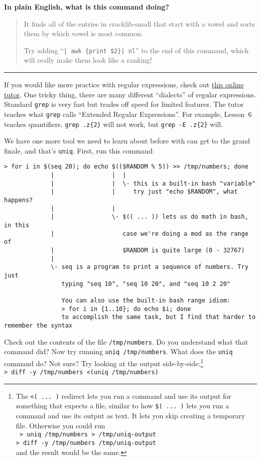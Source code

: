 \documentclass{article}
\begin{document}
\smallskip
\noindent
\textbf{In plain English, what is this command doing?}
\begin{quote}
  \color{violet}
  It finds all of the entries in cracklib-small that start with a vowel and
  sorts them by which vowel is most common.

  Try adding ``\texttt{| awk \textquotesingle\{print \$2\}\textquotesingle | nl}''
  to the end of this command, which will really make them look like a ranking!
\end{quote}


\vfill
\hrule
\smallskip
\noindent
{\footnotesize
  If you would like more practice with regular expressions, check out
  \href{http://regexone.com/}{this online tutor}. One tricky thing, there
  are many different ``dialects'' of regular expressions. Standard
  \texttt{grep} is very fast but trades off speed for limited features. The
  tutor teaches what \texttt{grep} calls ``Extended Regular Expressions''. For
  example, Lesson~6 teaches quantifiers, \texttt{grep .z\{2\}} will not work,
  but \texttt{grep -E .z\{2\}} will.
}

\newpage
\noindent
We have one more tool we need to learn about before with can get to the grand
finale, and that's \texttt{uniq}. First, run this command:
\begin{lstlisting}[keepspaces=true]
> for i in $(seq 20); do echo $(($RANDOM % 5)) >> /tmp/numbers; done
             |                |  |
             |                |  \- this is a built-in bash "variable"
             |                |     try just "echo $RANDOM", what happens?
             |                |
             |                \- $(( ... )) lets us do math in bash, in this
             |                   case we're doing a mod as the range of
             |                   $RANDOM is quite large (0 - 32767)
             |
             \- seq is a program to print a sequence of numbers. Try just
                typing "seq 10", "seq 10 20", and "seq 10 2 20"

                You can also use the built-in bash range idiom:
                > for i in {1..10}; do echo $i; done
                to accomplish the same task, but I find that harder to remember the syntax
\end{lstlisting}
%
Check out the contents of the file \texttt{/tmp/numbers}. Do you understand
what that command did?
\medskip
\noindent
Now try running \texttt{uniq /tmp/numbers}. What does the \texttt{uniq}
command do? Not sure? Try looking at the output side-by-side:\footnote{
  The \texttt{<( ...\ )} redirect lets you run a command and use its output for
  something that expects a file, similar to how \texttt{\$( ...\ )} lets you
  run a command and use its output as text. It lets you skip creating a
  temporary file. Otherwise you could run\\\texttt{
  > uniq /tmp/numbers > /tmp/uniq-output\\
  > diff -y /tmp/numbers /tmp/uniq-output\\
  }
  and the result would be the same.
}\\
\texttt{> diff -y /tmp/numbers <(uniq /tmp/numbers)}
\end{document}

